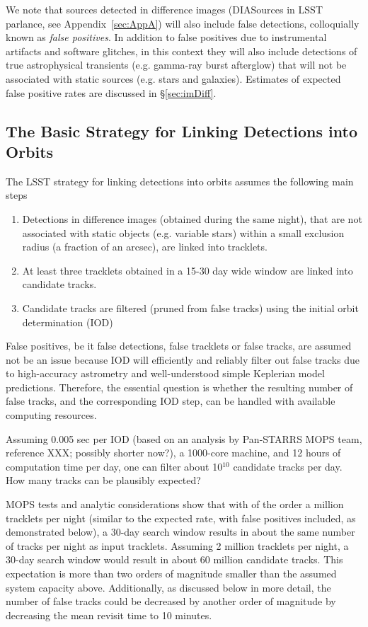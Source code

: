 We note that sources detected in difference images (DIASources in LSST parlance, see Appendix~\ref{sec:AppA})
will also include false detections, colloquially known as {\it false positives}. 
In addition to false positives due to instrumental artifacts and software glitches, 
in this context they will also include detections of true astrophysical transients 
(e.g. gamma-ray burst afterglow) that will not be associated with static sources
(e.g. stars and galaxies). Estimates of expected false positive rates are discussed
in \S\ref{sec:imDiff}. 



\subsection{The Basic Strategy for Linking Detections into Orbits} 

The LSST strategy for linking detections into orbits assumes the following main steps
\begin{enumerate}
\item Detections in difference images (obtained during the same night), that are not 
    associated with static objects (e.g. variable stars) within a small exclusion radius 
    (a fraction of an arcsec), are linked into tracklets.
\item At least three tracklets obtained in a 15-30 day wide window are linked into 
         candidate tracks.
\item Candidate tracks are filtered (pruned from false tracks) using the initial orbit 
         determination (IOD) 
\end{enumerate}

False positives, be it false detections, false tracklets or false tracks, are assumed not be 
an issue because IOD will efficiently and reliably filter out false tracks due to high-accuracy 
astrometry and well-understood simple Keplerian model predictions. Therefore, the 
essential question is whether the resulting number of false tracks, and the corresponding
IOD step, can be handled with available computing resources.

Assuming 0.005 sec per IOD (based on an analysis by Pan-STARRS MOPS team,
reference XXX; possibly shorter now?), a 1000-core machine, and 12 hours of computation 
time per day, one can filter about 10$^{10}$ candidate tracks per day. How many tracks 
can be plausibly expected? 

MOPS tests and analytic considerations show that with of the order a 
million tracklets per night (similar to the expected rate, with false positives included, 
as demonstrated below), a 30-day search window results in about the same number of 
tracks per night as input tracklets. Assuming 2 million tracklets per night, a 30-day 
search window would result in about 60 million candidate tracks. This expectation is more 
than two orders of magnitude smaller than the assumed system capacity above. Additionally, 
as discussed below in more detail, the number of false tracks could be decreased by another 
order of magnitude by decreasing the mean revisit time to 10 minutes. 



